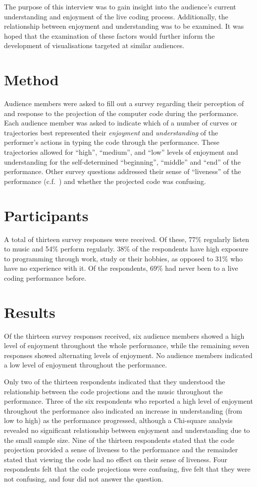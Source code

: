 The purpose of this interview was to gain insight into the audience's current understanding and enjoyment of the live coding process. Additionally, the relationship between enjoyment and understanding was to be examined. It was hoped that the examination of these factors would further inform the development of visualisations targeted at similar audiences.

\section{Method}

Audience members were asked to fill out a survey regarding their perception of and response to the projection of the computer code during the
performance. Each audience member was asked to indicate which of a
number of curves or trajectories best represented their \emph{enjoyment}
and \emph{understanding} of the performer's actions in typing the code
through the performance. These trajectories allowed for ``high'',
``medium'', and ``low'' levels of enjoyment and understanding for the
self-determined ``beginning'', ``middle'' and ``end'' of the
performance. Other survey questions addressed their sense of
``liveness'' of the performance (c.f.~\cite{Auslander}) and whether
the projected code was confusing.

\section{Participants}

A total of thirteen survey responses were received. Of these, 77\% regularly listen to music and 54\% perform regularly. 38\% of the respondents have high exposure to programming through work, study or their hobbies, as opposed to 31\% who have no experience with it. Of the respondents, 69\% had never been to a live coding performance before.

\section{Results}

Of the thirteen survey responses received, six audience members showed
a high level of enjoyment throughout the whole performance, while the
remaining seven responses showed alternating levels of enjoyment. No
audience members indicated a low level of enjoyment throughout the
performance.

Only two of the thirteen respondents indicated that they understood
the relationship between the code projections and the music throughout
the performance. Three of the six respondents who reported a high
level of enjoyment throughout the performance also indicated an
increase in understanding (from low to high) as the performance
progressed, although a Chi-square analysis revealed no significant
relationship between enjoyment and understanding due to the small
sample size. Nine of the thirteen respondents stated that the code
projection provided a sense of liveness to the performance and the
remainder stated that viewing the code had no effect on their sense of
liveness. Four respondents felt that the code projections were
confusing, five felt that they were not confusing, and four did not
answer the question.

